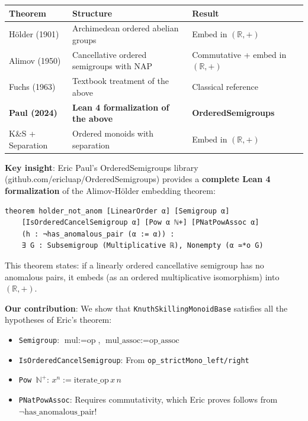 \documentclass[11pt]{article}
\theoremstyle{definition}
\theoremstyle{remark}
\begin{document}
\begin{center}
\begin{tabular}{lll}
\textbf{Theorem} & \textbf{Structure} & \textbf{Result} \\
\hline
H\"older (1901) & Archimedean ordered abelian groups & Embed in $(\mathbb{R}, +)$ \\
Alimov (1950) & Cancellative ordered semigroups with NAP & Commutative + embed in $(\mathbb{R}, +)$ \\
Fuchs (1963) & Textbook treatment of the above & Classical reference \\
\textbf{Paul (2024)} & \textbf{Lean 4 formalization of the above} & \textbf{OrderedSemigroups} \\
K\&S + Separation & Ordered monoids with separation & Embed in $(\mathbb{R}, +)$ \\
\end{tabular}
\end{center}

\textbf{Key insight}: Eric Paul's OrderedSemigroups library (github.com/ericluap/OrderedSemigroups) provides a \textbf{complete Lean 4 formalization} of the Alimov-H\"older embedding theorem:

\begin{lstlisting}[caption={Eric Paul's H\"older theorem (from OrderedSemigroups)}]
theorem holder_not_anom [LinearOrder α] [Semigroup α]
    [IsOrderedCancelSemigroup α] [Pow α ℕ+] [PNatPowAssoc α]
    (h : ¬has_anomalous_pair (α := α)) :
    ∃ G : Subsemigroup (Multiplicative ℝ), Nonempty (α ≃*o G)
\end{lstlisting}

This theorem states: if a linearly ordered cancellative semigroup has no anomalous pairs, it embeds (as an ordered multiplicative isomorphism) into $(\mathbb{R}, +)$.

\textbf{Our contribution}: We show that \texttt{KnuthSkillingMonoidBase} satisfies all the hypotheses of Eric's theorem:
\begin{itemize}
\item \texttt{Semigroup}: $\text{mul} := \text{op}$, $\text{mul\_assoc} := \text{op\_assoc}$
\item \texttt{IsOrderedCancelSemigroup}: From \texttt{op\_strictMono\_left/right}
\item \texttt{Pow \(\mathbb{N}^+\)}: $x^n := \text{iterate\_op}\, x\, n$
\item \texttt{PNatPowAssoc}: Requires commutativity, which Eric proves follows from $\neg\text{has\_anomalous\_pair}$!
\end{itemize}
\end{document}
